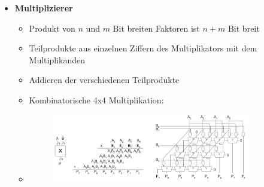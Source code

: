 \documentclass[11pt,a4paper]{article}
\begin{document}
\begin{itemize}
\item \textbf{Multiplizierer}
	\begin{itemize}
	\item Produkt von $n$ und $m$ Bit breiten Faktoren ist $n+m$ Bit breit
	\item Teilprodukte aus einzelnen Ziffern des Multiplikators mit dem Multiplikanden
	\item Addieren der verschiedenen Teilprodukte
	\item Kombinatorische 4x4 Multiplikation:
	\item[]
		\begin{figure}[H]
		\begin{center}
		\includegraphics[height=3cm]{Bilder/multiplikation}
		\end{center}
		\end{figure}
	\end{itemize}
\end{itemize}
\end{document}
